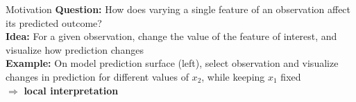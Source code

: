 \documentclass[10pt,compress,t,notes=noshow, xcolor=table]{beamer}
\begin{document}


\begin{framev}[align=top]{Motivation}
\textbf{Question:} How does varying a single feature of an observation affect its predicted outcome?\\
\spacer[0.25]
\textbf{Idea:} For a given observation, change the value of the feature of interest, and visualize how prediction changes\\
\spacer[0.25]
\textbf{Example:} On model prediction surface (left), select observation and visualize changes in prediction for different values of $x_2$, while keeping $x_1$ fixed \\ $\Rightarrow$ \textbf{local interpretation}
\\
\spacer[0.25]
\end{framev}
\end{document}
